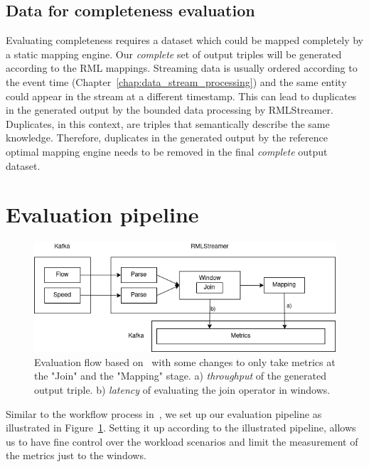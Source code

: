 \subsection{Data for completeness evaluation}
Evaluating completeness requires a dataset which could be mapped completely by a static 
mapping engine. 
Our \emph{complete} set of output triples will be generated according 
to the RML mappings. Streaming data is usually 
ordered according to the event time (Chapter~\ref{chap:data_stream_processing}) 
and the same entity could appear in the 
stream at a different timestamp. This can lead to duplicates in the generated output by 
the bounded data processing by RMLStreamer. Duplicates, in this context, are triples that semantically describe the 
same knowledge. Therefore, duplicates in the generated output by the reference optimal
mapping engine needs to be removed in the final \emph{complete} output dataset.

\section{Evaluation pipeline}

\begin{figure}[!htbp]
    \centering
    \includegraphics[width=\textwidth]{fig/evaluation_architecture.png}
    \caption{Evaluation flow based on~\cite{evalution_of_spe} with some changes to only 
    take metrics at the "Join" and the "Mapping" stage. a) \emph{throughput} of the generated output triple. 
    b) \emph{latency} of evaluating the join operator in windows.}
    \label{fig:evaluation_flow}
    
\end{figure}

Similar to the workflow process in~\cite{evalution_of_spe, benchmark_sce}, we set up
our evaluation pipeline as illustrated in Figure~\ref{fig:evaluation_flow}. Setting it 
up according to the illustrated pipeline, allows us to have fine control over the 
workload scenarios and limit the measurement of the metrics just to the windows. 




